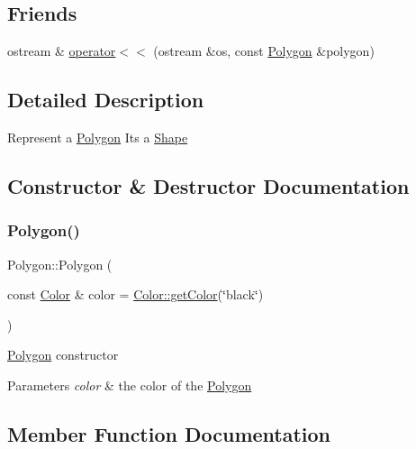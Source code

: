 \subsection*{Friends}
\begin{DoxyCompactItemize}
\item 
ostream \& \hyperlink{class_polygon_af7ce19139e0c1e3637615abf41b8befb}{operator$<$$<$} (ostream \&os, const \hyperlink{class_polygon}{Polygon} \&polygon)
\end{DoxyCompactItemize}


\subsection{Detailed Description}
Represent a \hyperlink{class_polygon}{Polygon} It\textquotesingle{}s a \hyperlink{class_shape}{Shape} 

\subsection{Constructor \& Destructor Documentation}
\hypertarget{class_polygon_a9010c30fc3b029a2cc26199c15f915b6}{}\label{class_polygon_a9010c30fc3b029a2cc26199c15f915b6} 
\subsubsection{\texorpdfstring{Polygon()}{Polygon()}}
{\footnotesize\ttfamily Polygon\+::\+Polygon (\begin{DoxyParamCaption}\item[{const \hyperlink{class_color}{Color} \&}]{color = {\ttfamily \hyperlink{class_color_a94697e8c9eb81124c5a7c1439e1e7348}{Color\+::get\+Color}(\char`\"{}black\char`\"{})} }\end{DoxyParamCaption})}

\hyperlink{class_polygon}{Polygon} constructor 
\begin{DoxyParams}{Parameters}
{\em color} & the color of the \hyperlink{class_polygon}{Polygon} \\
\hline
\end{DoxyParams}


\subsection{Member Function Documentation}
\hypertarget{class_polygon_a9a5b91783fca1fd154bc97a1e416500b}{}\label{class_polygon_a9a5b91783fca1fd154bc97a1e416500b} 
